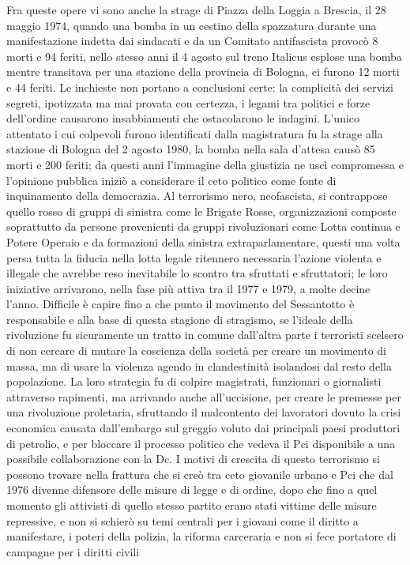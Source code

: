 Fra queste opere vi sono anche la strage di Piazza della Loggia a Brescia, il 28 maggio 1974, quando una bomba in un cestino della spazzatura durante una manifestazione indetta dai sindacati e da un Comitato antifascista provocò 8 morti e 94 feriti, nello stesso anni il 4 agosto sul treno Italicus esplose una bomba mentre transitava per una stazione della provincia di Bologna, ci furono 12 morti e 44 feriti.
Le inchieste non portano a conclusioni certe: la complicità dei servizi segreti, ipotizzata ma mai provata con certezza, i legami tra politici e forze dell'ordine causarono insabbiamenti che ostacolarono le indagini.
L'unico attentato i cui colpevoli furono identificati dalla magistratura fu la strage alla stazione di Bologna del 2 agosto 1980, la bomba nella sala d'attesa causò 85 morti e 200 feriti; da questi anni l'immagine della giustizia ne uscì compromessa e l'opinione pubblica iniziò a considerare il ceto politico come fonte di inquinamento della democrazia.
Al terrorismo nero, neofascista, si contrappose quello rosso di gruppi di sinistra come le Brigate Rosse, organizzazioni composte soprattutto da persone provenienti da gruppi rivoluzionari come Lotta continua e Potere Operaio e da formazioni della sinistra extraparlamentare, questi una volta persa tutta la fiducia nella lotta legale ritennero necessaria l'azione violenta e illegale che avrebbe reso inevitabile lo scontro tra sfruttati e sfruttatori; le loro iniziative arrivarono, nella fase più attiva tra il 1977 e 1979, a molte decine l'anno.
Difficile è  capire fino a che punto il movimento del Sessantotto è responsabile e alla base di questa stagione di stragismo, se l'ideale della rivoluzione fu sicuramente un tratto in comune dall'altra parte i terroristi scelsero di non cercare di mutare la coscienza della società per creare un movimento di massa, ma di usare la violenza agendo in clandestinità isolandosi dal resto della popolazione. 
La loro strategia fu di colpire magistrati, funzionari o giornalisti attraverso rapimenti, ma arrivando anche all'uccisione, per creare le premesse per una rivoluzione proletaria, sfruttando il malcontento dei lavoratori dovuto la crisi economica causata dall'embargo sul greggio voluto dai principali paesi produttori di petrolio, e per bloccare il processo politico che vedeva il Pci disponibile a una possibile collaborazione con la Dc.
I motivi di crescita di questo terrorismo si possono trovare nella frattura che si creò tra ceto giovanile urbano e Pci che dal 1976 divenne difensore delle misure di legge e di ordine, dopo che fino a quel momento gli attivisti di quello stesso partito erano stati vittime delle misure repressive, e non si schierò su temi centrali per i giovani come il diritto a manifestare, i poteri della polizia, la riforma carceraria e non si fece portatore di campagne per i diritti civili 
